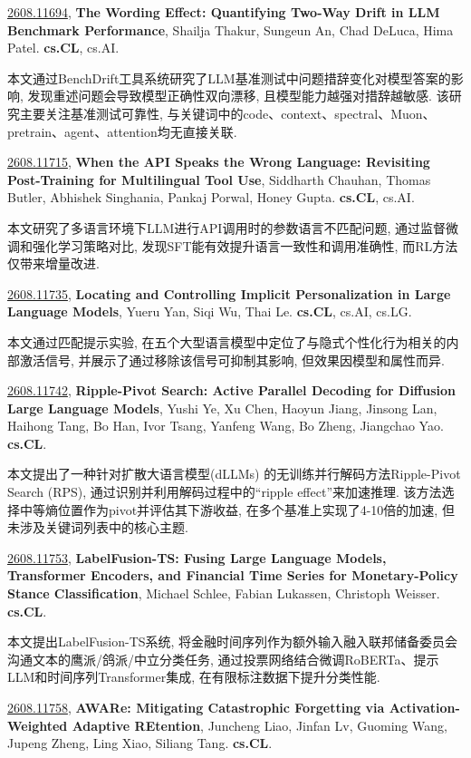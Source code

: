 \documentclass[9pt, a4paper]{article}
\theoremstyle{plain}
\theoremstyle{definition}
\theoremstyle{remark}
\newcommand{\arxivwithtarget}[3]{\hypertarget{#1}{}\href{https://arxiv.org/abs/#1}{#1}, \textbf{\textcolor{arxivblue}{#2}}, #3. }
\begin{document}
\arxivwithtarget{2608.11694}{The Wording Effect: Quantifying Two-Way Drift in LLM Benchmark Performance}{Shailja Thakur, Sungeun An, Chad DeLuca, Hima Patel}\textbf{cs.CL}, cs.AI.

本文通过BenchDrift工具系统研究了LLM基准测试中问题措辞变化对模型答案的影响, 发现重述问题会导致模型正确性双向漂移, 且模型能力越强对措辞越敏感. 该研究主要关注基准测试可靠性, 与关键词中的code、context、spectral、Muon、pretrain、agent、attention均无直接关联.


\arxivwithtarget{2608.11715}{When the API Speaks the Wrong Language: Revisiting Post-Training for Multilingual Tool Use}{Siddharth Chauhan, Thomas Butler, Abhishek Singhania, Pankaj Porwal, Honey Gupta}\textbf{cs.CL}, cs.AI.

本文研究了多语言环境下LLM进行API调用时的参数语言不匹配问题, 通过监督微调和强化学习策略对比, 发现SFT能有效提升语言一致性和调用准确性, 而RL方法仅带来增量改进.


\arxivwithtarget{2608.11735}{Locating and Controlling Implicit Personalization in Large Language Models}{Yueru Yan, Siqi Wu, Thai Le}\textbf{cs.CL}, cs.AI, cs.LG.

本文通过匹配提示实验, 在五个大型语言模型中定位了与隐式个性化行为相关的内部激活信号, 并展示了通过移除该信号可抑制其影响, 但效果因模型和属性而异.


\arxivwithtarget{2608.11742}{Ripple-Pivot Search: Active Parallel Decoding for Diffusion Large Language Models}{Yushi Ye, Xu Chen, Haoyun Jiang, Jinsong Lan, Haihong Tang, Bo Han, Ivor Tsang, Yanfeng Wang, Bo Zheng, Jiangchao Yao}\textbf{cs.CL}.

本文提出了一种针对扩散大语言模型(dLLMs) 的无训练并行解码方法Ripple-Pivot Search (RPS), 通过识别并利用解码过程中的“ripple effect”来加速推理. 该方法选择中等熵位置作为pivot并评估其下游收益, 在多个基准上实现了4-10倍的加速, 但未涉及关键词列表中的核心主题.


\arxivwithtarget{2608.11753}{LabelFusion-TS: Fusing Large Language Models, Transformer Encoders, and Financial Time Series for Monetary-Policy Stance Classification}{Michael Schlee, Fabian Lukassen, Christoph Weisser}\textbf{cs.CL}.

本文提出LabelFusion-TS系统, 将金融时间序列作为额外输入融入联邦储备委员会沟通文本的鹰派/鸽派/中立分类任务, 通过投票网络结合微调RoBERTa、提示LLM和时间序列Transformer集成, 在有限标注数据下提升分类性能.


\arxivwithtarget{2608.11758}{AWARe: Mitigating Catastrophic Forgetting via Activation-Weighted Adaptive REtention}{Juncheng Liao, Jinfan Lv, Guoming Wang, Jupeng Zheng, Ling Xiao, Siliang Tang}\textbf{cs.CL}.
\end{document}
